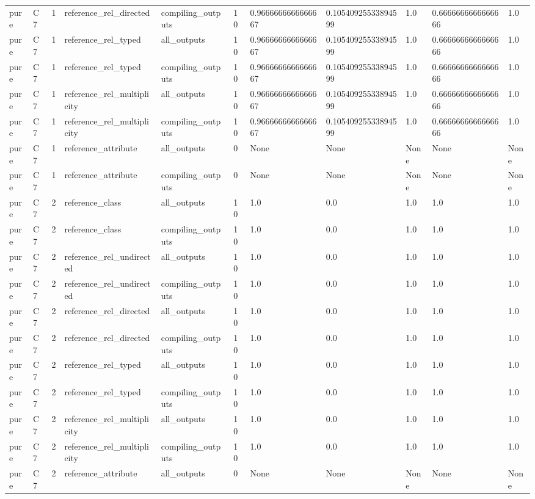 \begin{tabular}{lllllllllll}
pure & C7 & 1 & reference\_rel\_directed & compiling\_outputs & 10 & 0.9666666666666667 & 0.10540925533894599 & 1.0 & 0.6666666666666666 & 1.0 \\
pure & C7 & 1 & reference\_rel\_typed & all\_outputs & 10 & 0.9666666666666667 & 0.10540925533894599 & 1.0 & 0.6666666666666666 & 1.0 \\
pure & C7 & 1 & reference\_rel\_typed & compiling\_outputs & 10 & 0.9666666666666667 & 0.10540925533894599 & 1.0 & 0.6666666666666666 & 1.0 \\
pure & C7 & 1 & reference\_rel\_multiplicity & all\_outputs & 10 & 0.9666666666666667 & 0.10540925533894599 & 1.0 & 0.6666666666666666 & 1.0 \\
pure & C7 & 1 & reference\_rel\_multiplicity & compiling\_outputs & 10 & 0.9666666666666667 & 0.10540925533894599 & 1.0 & 0.6666666666666666 & 1.0 \\
pure & C7 & 1 & reference\_attribute & all\_outputs & 0 & None & None & None & None & None \\
pure & C7 & 1 & reference\_attribute & compiling\_outputs & 0 & None & None & None & None & None \\
pure & C7 & 2 & reference\_class & all\_outputs & 10 & 1.0 & 0.0 & 1.0 & 1.0 & 1.0 \\
pure & C7 & 2 & reference\_class & compiling\_outputs & 10 & 1.0 & 0.0 & 1.0 & 1.0 & 1.0 \\
pure & C7 & 2 & reference\_rel\_undirected & all\_outputs & 10 & 1.0 & 0.0 & 1.0 & 1.0 & 1.0 \\
pure & C7 & 2 & reference\_rel\_undirected & compiling\_outputs & 10 & 1.0 & 0.0 & 1.0 & 1.0 & 1.0 \\
pure & C7 & 2 & reference\_rel\_directed & all\_outputs & 10 & 1.0 & 0.0 & 1.0 & 1.0 & 1.0 \\
pure & C7 & 2 & reference\_rel\_directed & compiling\_outputs & 10 & 1.0 & 0.0 & 1.0 & 1.0 & 1.0 \\
pure & C7 & 2 & reference\_rel\_typed & all\_outputs & 10 & 1.0 & 0.0 & 1.0 & 1.0 & 1.0 \\
pure & C7 & 2 & reference\_rel\_typed & compiling\_outputs & 10 & 1.0 & 0.0 & 1.0 & 1.0 & 1.0 \\
pure & C7 & 2 & reference\_rel\_multiplicity & all\_outputs & 10 & 1.0 & 0.0 & 1.0 & 1.0 & 1.0 \\
pure & C7 & 2 & reference\_rel\_multiplicity & compiling\_outputs & 10 & 1.0 & 0.0 & 1.0 & 1.0 & 1.0 \\
pure & C7 & 2 & reference\_attribute & all\_outputs & 0 & None & None & None & None & None \\

\end{tabular}
